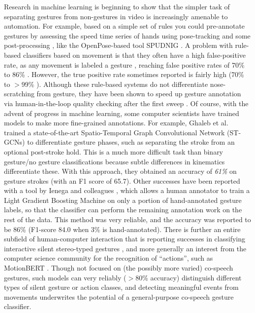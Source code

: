 \documentclass[11pt,headings=small,cleardoublepage=empty,tocflat,numbers=noenddot,twoside,captions=tableheading]{scrbook}
\begin{document}
\begin{refsection}
Research in machine learning is beginning to show that the simpler task of separating gestures from non-gestures in video is increasingly amenable to automation. For example, based on a simple set of rules you could pre-annotate gestures by assessing the speed time series of hands using pose-tracking and some post-processing \parencite{ripperdaSpeedingDetectionNoniconic2020, eijkCABBDatasetMultimodalundermajorrevision}, like the OpenPose-based \parencite{caoOpenPoseRealtimeMultiPerson2021} tool SPUDNIG \parencite{ripperdaSpeedingDetectionNoniconic2020}. A problem with rule-based classifiers based on movement is that they often have a high false-positive rate, as any movement is labeled a gesture \parencite{pouwSemanticallyRelatedGestures2021}, reaching false positive rates of 70\% \parencite{ripperdaSpeedingDetectionNoniconic2020} to 86\% \parencite{pouwSemanticallyRelatedGestures2021}. However, the true positive rate sometimes reported is fairly high (70\% \parencite{pouwSemanticallyRelatedGestures2021} to $>$99\% \parencite{ripperdaSpeedingDetectionNoniconic2020}). Although these rule-based systems do not differentiate nose-scratching from gesture, they have been shown to speed up gesture annotation via human-in-the-loop quality checking after the first sweep \parencite{ripperdaSpeedingDetectionNoniconic2020}. Of course, with the advent of progress in machine learning, some computer scientists have trained models to make more fine-grained annotations. For example, Ghaleb et al.~\parencite{ghalebCoSpeechGestureDetection2024} trained a state-of-the-art Spatio-Temporal Graph Convolutional
Network (ST-GCNs) to differentiate gesture phases, such as separating the stroke from an optional post-stroke hold. This is a much more difficult task than binary gesture/no gesture classifications because subtle differences in kinematics differentiate these. With this approach, they obtained an accuracy of \textit{61\%} on gesture strokes (with an F1 score of 65.7). Other successes have been reported with a tool by Ienega and colleagues \parencite{ienagaSemiautomationGestureAnnotation2022}, which allows a human annotator to train a Light Gradient Boosting Machine on only a portion of hand-annotated gesture labels, so that the classifier can perform the remaining annotation work on the rest of the data. This method was very reliable, and the accuracy was reported to be 86\% (F1-score 84.0 when 3\% is hand-annotated). There is further an entire subfield of human-computer interaction that is reporting successes in classifying interactive silent stereo-typed gestures \parencite{molchanovOnlineDetectionClassification2016, frontedduDynamicHandGesture2022}, and more generally an interest from the computer science community for the recognition of ``actions'', such as MotionBERT \parencite{zhuMotionBERTUnifiedPerspective2023}. Though not focused on (the possibly more varied) co-speech gestures, such models can very reliably ($>$80\% accuracy) distinguish different types of silent gesture or action classes, and detecting meaningful events from movements underwrites the potential of a general-purpose co-speech gesture classifier.


\end{refsection}
\end{document}
